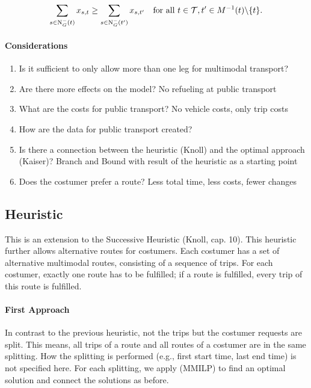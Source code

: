 \begin{align}
\label{eq:route}
	\sum_{s\in\operatorname{N}_G^-(t)} x_{s,t} \geq \sum_{s\in\operatorname{N}_G^-(t')} x_{s,t'} & & \text{for all } t\in\mathcal{T}, t'\in M^{-1}(t)\backslash\{t\}.
\end{align}

\paragraph{Considerations}

\begin{enumerate}
	\item{Is it sufficient to only allow more than one leg for multimodal transport?}
	\item{Are there more effects on the model? No refueling at public transport}
	\item{What are the costs for public transport? No vehicle costs, only trip costs}
	\item{How are the data for public transport created?}
	\item{Is there a connection between the heuristic (Knoll) and the optimal approach (Kaiser)? Branch and Bound with result of the heuristic as a starting point}
	\item{Does the costumer prefer a route? Less total time, less costs, fewer changes}
\end{enumerate}


\subsection{Heuristic}

This is an extension to the Successive Heuristic (Knoll, cap. 10). This heuristic further allows alternative routes for costumers. Each costumer has a set of alternative multimodal routes, consisting of a sequence of trips. For each costumer, exactly one route has to be fulfilled; if a route is fulfilled, every trip of this route is fulfilled.

\paragraph{First Approach} \parfill

In contrast to the previous heuristic, not the trips but the costumer requests are split. This means, all trips of a route and all routes of a costumer are in the same splitting. How the splitting is performed (e.g., first start time, last end time) is not specified here. For each splitting, we apply (MMILP) to find an optimal solution and connect the solutions as before. 

